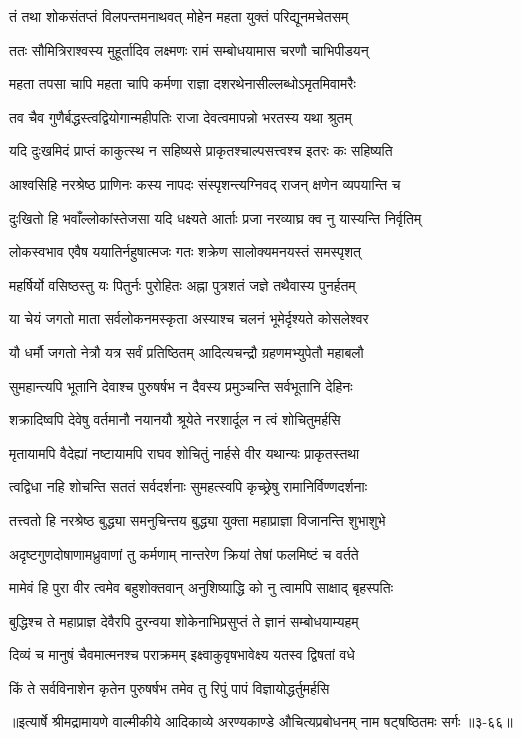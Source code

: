
\twolineshloka
{तं तथा शोकसंतप्तं विलपन्तमनाथवत्}
{मोहेन महता युक्तं परिद्यूनमचेतसम्} %

\twolineshloka
{ततः सौमित्रिराश्वस्य मुहूर्तादिव लक्ष्मणः}
{रामं सम्बोधयामास चरणौ चाभिपीडयन्} %

\twolineshloka
{महता तपसा चापि महता चापि कर्मणा}
{राज्ञा दशरथेनासील्लब्धोऽमृतमिवामरैः} %

\twolineshloka
{तव चैव गुणैर्बद्धस्त्वद्वियोगान्महीपतिः}
{राजा देवत्वमापन्नो भरतस्य यथा श्रुतम्} %

\twolineshloka
{यदि दुःखमिदं प्राप्तं काकुत्स्थ न सहिष्यसे}
{प्राकृतश्चाल्पसत्त्वश्च इतरः कः सहिष्यति} %

\twolineshloka
{आश्वसिहि नरश्रेष्ठ प्राणिनः कस्य नापदः}
{संस्पृशन्त्यग्निवद् राजन् क्षणेन व्यपयान्ति च} %

\twolineshloka
{दुःखितो हि भवाँल्लोकांस्तेजसा यदि धक्ष्यते}
{आर्ताः प्रजा नरव्याघ्र क्व नु यास्यन्ति निर्वृतिम्} %

\twolineshloka
{लोकस्वभाव एवैष ययातिर्नहुषात्मजः}
{गतः शक्रेण सालोक्यमनयस्तं समस्पृशत्} %

\twolineshloka
{महर्षिर्यो वसिष्ठस्तु यः पितुर्नः पुरोहितः}
{अह्ना पुत्रशतं जज्ञे तथैवास्य पुनर्हतम्} %

\twolineshloka
{या चेयं जगतो माता सर्वलोकनमस्कृता}
{अस्याश्च चलनं भूमेर्दृश्यते कोसलेश्वर} %

\twolineshloka
{यौ धर्मौ जगतो नेत्रौ यत्र सर्वं प्रतिष्ठितम्}
{आदित्यचन्द्रौ ग्रहणमभ्युपेतौ महाबलौ} %

\twolineshloka
{सुमहान्त्यपि भूतानि देवाश्च पुरुषर्षभ}
{न दैवस्य प्रमुञ्चन्ति सर्वभूतानि देहिनः} %

\twolineshloka
{शक्रादिष्वपि देवेषु वर्तमानौ नयानयौ}
{श्रूयेते नरशार्दूल न त्वं शोचितुमर्हसि} %

\twolineshloka
{मृतायामपि वैदेह्यां नष्टायामपि राघव}
{शोचितुं नार्हसे वीर यथान्यः प्राकृतस्तथा} %

\twolineshloka
{त्वद्विधा नहि शोचन्ति सततं सर्वदर्शनाः}
{सुमहत्स्वपि कृच्छ्रेषु रामानिर्विण्णदर्शनाः} %

\twolineshloka
{तत्त्वतो हि नरश्रेष्ठ बुद्ध्या समनुचिन्तय}
{बुद्ध्या युक्ता महाप्राज्ञा विजानन्ति शुभाशुभे} %

\twolineshloka
{अदृष्टगुणदोषाणामध्रुवाणां तु कर्मणाम्}
{नान्तरेण क्रियां तेषां फलमिष्टं च वर्तते} %

\twolineshloka
{मामेवं हि पुरा वीर त्वमेव बहुशोक्तवान्}
{अनुशिष्याद्धि को नु त्वामपि साक्षाद् बृहस्पतिः} %

\twolineshloka
{बुद्धिश्च ते महाप्राज्ञ देवैरपि दुरन्वया}
{शोकेनाभिप्रसुप्तं ते ज्ञानं सम्बोधयाम्यहम्} %

\twolineshloka
{दिव्यं च मानुषं चैवमात्मनश्च पराक्रमम्}
{इक्ष्वाकुवृषभावेक्ष्य यतस्व द्विषतां वधे} %

\twolineshloka
{किं ते सर्वविनाशेन कृतेन पुरुषर्षभ}
{तमेव तु रिपुं पापं विज्ञायोद्धर्तुमर्हसि} %


॥इत्यार्षे श्रीमद्रामायणे वाल्मीकीये आदिकाव्ये अरण्यकाण्डे औचित्यप्रबोधनम् नाम षट्षष्ठितमः सर्गः ॥३-६६॥
